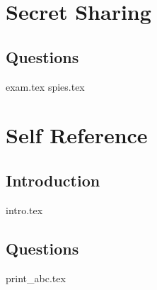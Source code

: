 \documentclass{exam}
\begin{document}
\section{Secret Sharing}
\subsection{Questions}
\begin{questions}
{exam.tex}
{spies.tex}
\end{questions}

\section{Self Reference}
\subsection{Introduction}
{intro.tex}
\subsection{Questions}
\begin{questions}
{print_abc.tex}
\end{questions}
\end{document}
